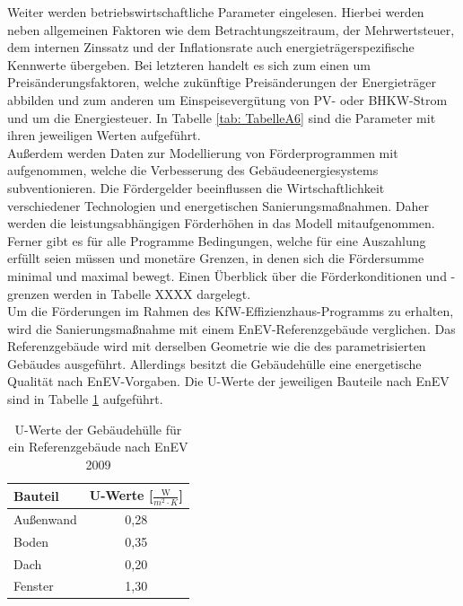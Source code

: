 Weiter werden betriebswirtschaftliche Parameter eingelesen.
Hierbei werden neben allgemeinen Faktoren wie dem Betrachtungszeitraum, der Mehrwertsteuer, dem internen Zinssatz und der Inflationsrate auch energieträgerspezifische Kennwerte übergeben.
Bei letzteren handelt es sich zum einen um Preisänderungsfaktoren, welche zukünftige Preisänderungen der Energieträger abbilden und zum anderen um Einspeisevergütung von PV- oder BHKW-Strom und um die Energiesteuer.
In Tabelle \ref{tab: TabelleA6} sind die Parameter mit ihren jeweiligen Werten aufgeführt.\\
Außerdem werden Daten zur Modellierung von Förderprogrammen mit aufgenommen, welche die Verbesserung des Gebäudeenergiesystems subventionieren.
Die Fördergelder beeinflussen die Wirtschaftlichkeit verschiedener Technologien und energetischen Sanierungsmaßnahmen.
Daher werden die leistungsabhängigen Förderhöhen in das Modell mitaufgenommen.
Ferner gibt es für alle Programme Bedingungen, welche für eine Auszahlung erfüllt seien müssen und monetäre Grenzen, in denen sich die Fördersumme minimal und maximal bewegt.
Einen Überblick über die Förderkonditionen und -grenzen werden in Tabelle XXXX dargelegt.\\
Um die Förderungen im Rahmen des KfW-Effizienzhaus-Programms zu erhalten, wird die Sanierungsmaßnahme mit einem EnEV-Referenzgebäude verglichen.
Das Referenzgebäude wird mit derselben Geometrie wie die des parametrisierten Gebäudes ausgeführt.
Allerdings besitzt die Gebäudehülle eine energetische Qualität nach EnEV-Vorgaben.
Die U-Werte der jeweiligen Bauteile nach EnEV sind in Tabelle \ref{tab: Tabelle322} aufgeführt.

\begin{table}[H]\centering
\begin{tabular}{|l|c|}
\hline
\rowcolor[HTML]{C0C0C0} 
Bauteil & U-Werte {[}\(\frac{\text{W}}{m^2 \cdot K}\){]} \\ \hline
Außenwand & 0,28 \\ \hline
\rowcolor[HTML]{EFEFEF} 
Boden & 0,35 \\ \hline
Dach & 0,20 \\ \hline
\rowcolor[HTML]{EFEFEF} 
Fenster & 1,30 \\ \hline
\end{tabular}
\caption{U-Werte der Gebäudehülle für ein Referenzgebäude nach EnEV 2009}
\label{tab: Tabelle322}
\end{table}

